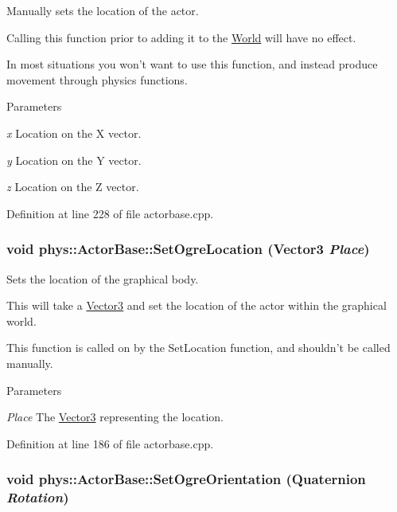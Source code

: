 Manually sets the location of the actor. 

Calling this function prior to adding it to the \hyperlink{classphys_1_1World}{World} will have no effect. \par
 In most situations you won't want to use this function, and instead produce movement through physics functions. 
\begin{DoxyParams}{Parameters}
\item[{\em x}]Location on the X vector. \item[{\em y}]Location on the Y vector. \item[{\em z}]Location on the Z vector. \end{DoxyParams}


Definition at line 228 of file actorbase.cpp.

\hypertarget{classphys_1_1ActorBase_a192ced7c3191f3f9d4921aad73952046}{
\subsubsection[{SetOgreLocation}]{\setlength{\rightskip}{0pt plus 5cm}void phys::ActorBase::SetOgreLocation ({\bf Vector3} {\em Place})}}
\label{d8/d0f/classphys_1_1ActorBase_a192ced7c3191f3f9d4921aad73952046}


Sets the location of the graphical body. 

This will take a \hyperlink{classphys_1_1Vector3}{Vector3} and set the location of the actor within the graphical world. \par
 This function is called on by the SetLocation function, and shouldn't be called manually. 
\begin{DoxyParams}{Parameters}
\item[{\em Place}]The \hyperlink{classphys_1_1Vector3}{Vector3} representing the location. \end{DoxyParams}


Definition at line 186 of file actorbase.cpp.

\hypertarget{classphys_1_1ActorBase_a7b2d13cb1e8bba60eeae782a53fd5e49}{
\subsubsection[{SetOgreOrientation}]{\setlength{\rightskip}{0pt plus 5cm}void phys::ActorBase::SetOgreOrientation ({\bf Quaternion} {\em Rotation})}}
\label{d8/d0f/classphys_1_1ActorBase_a7b2d13cb1e8bba60eeae782a53fd5e49}


